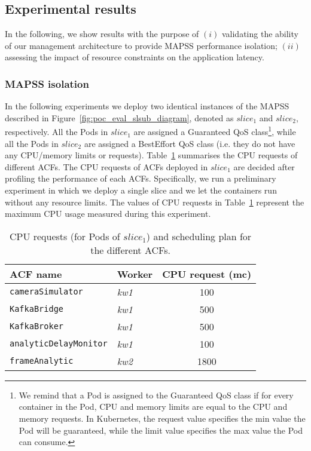 \subsection{Experimental results}
\label{sec:results}
\noindent
%
In the following, we show results with the purpose of $(i)$ validating the ability of our management architecture to provide MAPSS performance isolation; $(ii)$ assessing the impact of resource constraints on the application latency. 
%
\subsubsection{MAPSS isolation}
\label{sec:test1}
\noindent
%
In the following experiments we deploy two identical instances of the MAPSS described in Figure~\ref{fig:poc_eval_slsub_diagram}, denoted as $slice_1$ and $slice_2$, respectively. All the Pods in $slice_1$ are assigned a Guaranteed QoS class\footnote{We remind that a Pod is assigned to the Guaranteed QoS class if for every container in the Pod, CPU and memory limits are equal to the CPU and memory requests. In Kubernetes, the request value specifies the min value the Pod will be guaranteed, while the limit value specifies the max value the Pod can consume.}, while all the Pods in $slice_2$ are assigned a BestEffort QoS class (i.e. they do not have any CPU/memory limits or requests). Table~\ref{tab:cpu_request} summarises the CPU requests of different ACFs. The CPU requests of ACFs deployed in $slice_1$ are decided after profiling the performance of each ACFs. Specifically, we run a preliminary experiment in which we deploy a single slice and we let the containers run without any resource limits. The values of CPU requests in Table~\ref{tab:cpu_request} represent the maximum CPU usage measured during this experiment.    
%
\begin{table}[ht]
    \centering
    \small
    \begin{tabular}{|l|l|c|}
    \hline
        ACF name & Worker & CPU request (mc) \\
        \hline \hline
        \texttt{cameraSimulator}  & \textit{kw1} & 100 \\
        \texttt{KafkaBridge}  & \textit{kw1} & 500 \\
        \texttt{KafkaBroker}  & \textit{kw1} & 500 \\
        \texttt{analyticDelayMonitor}  & \textit{kw1} & 100 \\
        \texttt{frameAnalytic}  & \textit{kw2} & 1800 \\
         \hline 
    \end{tabular}
    \caption{CPU requests (for Pods of $slice_1$) and scheduling plan for the different ACFs.}
    \label{tab:cpu_request}
    \vspace{-0.2cm}
\end{table}
